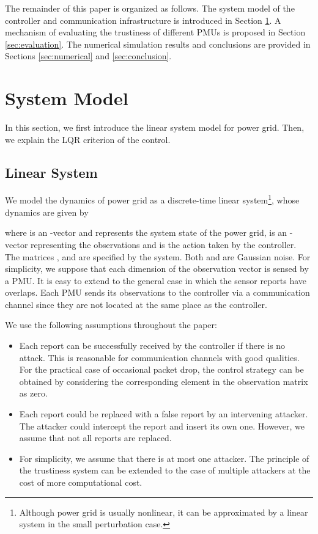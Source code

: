 \documentclass[journal,10pt,twocolumn]{IEEEtran}
\begin{document}
The remainder of this paper is organized as follows. The system model of the controller and communication infrastructure is introduced in Section \ref{sec:system}. A mechanism of evaluating the trustiness of different PMUs is proposed in Section \ref{sec:evaluation}. The numerical simulation results and conclusions are provided in Sections \ref{sec:numerical} and \ref{sec:conclusion}.

\section{System Model}\label{sec:system}
In this section, we first introduce the linear system model for power grid. Then, we explain the LQR criterion of the control.

\subsection{Linear System}
We model the dynamics of power grid as a discrete-time linear system\footnote{Although power grid is usually nonlinear, it can be approximated by a linear system in the small perturbation case.}, whose dynamics are given by

where  is an -vector and represents the system state of the power grid,  is an -vector representing the observations and  is the action taken by the controller. The matrices ,  and  are specified by the system. Both  and  are Gaussian noise. For simplicity, we suppose that each dimension of the observation vector  is sensed by a PMU. It is easy to extend to the general case in which the sensor reports have overlaps. Each PMU sends its observations to the controller via a communication channel since they are not located at the same place as the controller.

We use the following assumptions throughout the paper:
\begin{itemize}
\item Each report can be successfully received by the controller if there is no attack. This is reasonable for communication channels with good qualities. For the practical case of occasional packet drop, the control strategy can be obtained by considering the corresponding element in the observation matrix  as zero.

\item Each report could be replaced with a false report by an intervening attacker. The attacker could intercept the report and insert its own one. However, we assume that not all reports are replaced.

\item For simplicity, we assume that there is at most one attacker. The principle of the trustiness system can be extended to the case of multiple attackers at the cost of more computational cost.
\end{itemize}
\end{document}

